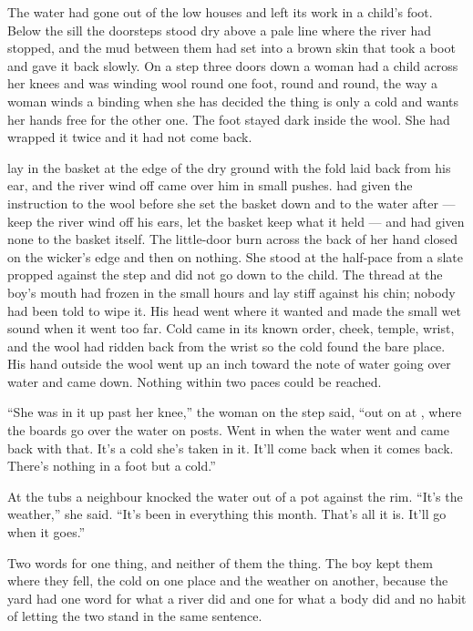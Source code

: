 
The water had gone out of the low houses and left its work in a child's foot. Below the sill the doorsteps stood dry above a pale line where the river had stopped, and the mud between them had set into a brown skin that took a boot and gave it back slowly. On a step three doors down a woman had a child across her knees and was winding wool round one foot, round and round, the way a woman winds a binding when she has decided the thing is only a cold and wants her hands free for the other one. The foot stayed dark inside the wool. She had wrapped it twice and it had not come back.

 lay in the basket at the edge of the dry ground with the fold laid back from his ear, and the river wind off  came over him in small pushes.  had given the instruction to the wool before she set the basket down and to the water after --- keep the river wind off his ears, let the basket keep what it held --- and had given none to the basket itself. The little-door burn across the back of her hand closed on the wicker's edge and then on nothing. She stood at the half-pace from a slate propped against the step and did not go down to the child. The thread at the boy's mouth had frozen in the small hours and lay stiff against his chin; nobody had been told to wipe it. His head went where it wanted and made the small wet sound when it went too far. Cold came in its known order, cheek, temple, wrist, and the wool had ridden back from the wrist so the cold found the bare place. His hand outside the wool went up an inch toward the note of water going over water and came down. Nothing within two paces could be reached.

“She was in it up past her knee,” the woman on the step said, “out on  at , where the boards go over the water on posts. Went in when the water went and came back with that. It's a cold she's taken in it. It'll come back when it comes back. There's nothing in a foot but a cold.”

At the tubs a neighbour knocked the water out of a pot against the rim. “It's the weather,” she said. “It's been in everything this month. That's all it is. It'll go when it goes.”

Two words for one thing, and neither of them the thing. The boy kept them where they fell, the cold on one place and the weather on another, because the yard had one word for what a river did and one for what a body did and no habit of letting the two stand in the same sentence.

